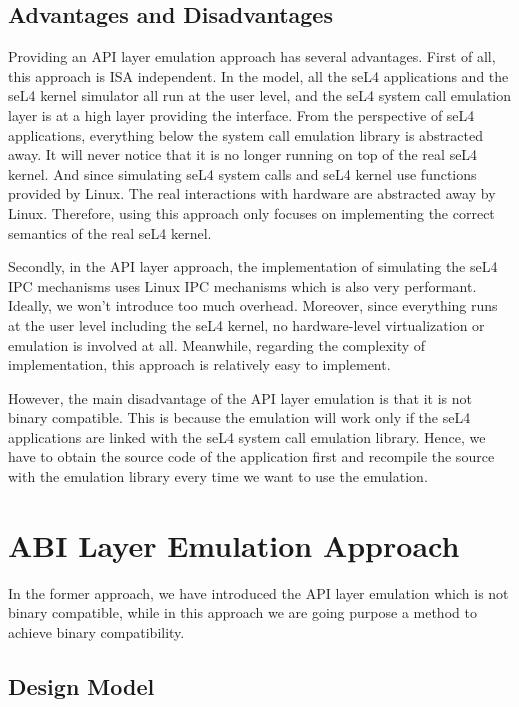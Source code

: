 \subsection{Advantages and Disadvantages}

Providing an API layer emulation approach has several advantages. First of all, this approach is ISA independent. In the model, all the seL4 applications and the seL4 kernel simulator all run at the user level, and the seL4 system call emulation layer is at a high layer providing the interface. From the perspective of seL4 applications, everything below the system call emulation library is abstracted away. It will never notice that it is no longer running on top of the real seL4 kernel. And since simulating seL4 system calls and seL4 kernel use functions provided by Linux. The real interactions with hardware are abstracted away by Linux. Therefore, using this approach only focuses on implementing the correct semantics of the real seL4 kernel.

Secondly, in the API layer approach, the implementation of simulating the seL4 IPC mechanisms uses Linux IPC mechanisms which is also very performant. Ideally, we won't introduce too much overhead. Moreover, since everything runs at the user level including the seL4 kernel, no hardware-level virtualization or emulation is involved at all. Meanwhile, regarding the complexity of implementation, this approach is relatively easy to implement.

However, the main disadvantage of the API layer emulation is that it is not binary compatible. This is because the emulation will work only if the seL4 applications are linked with the seL4 system call emulation library. Hence, we have to obtain the source code of the application first and recompile the source with the emulation library every time we want to use the emulation.    

\section{ABI Layer Emulation Approach}

In the former approach, we have introduced the API layer emulation which is not binary compatible, while in this approach we are going purpose a method to achieve binary compatibility. 

\subsection{Design Model}

